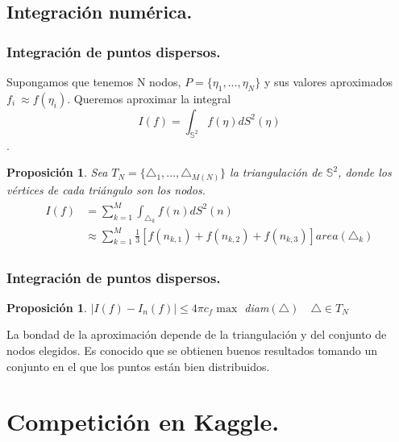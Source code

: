 \documentclass{beamer}
\theoremstyle{plain}
\theoremstyle{definition}
\theoremstyle{plain}
\newtheorem{prop}[thm]{Proposici\'{o}n}
\theoremstyle{definition}
\theoremstyle{remark}
\theoremstyle{definition}
\begin{document}
\subsection{Integración numérica.}
\begin{frame}
\end{frame}
\begin{frame}
	\frametitle{Integración de puntos dispersos.}
	Supongamos que tenemos N nodos, $P=\{\eta_1,...,\eta_N\}$ y sus valores aproximados $f_i~\approx f(\eta_i)$. Queremos aproximar la integral $$I(f) =  \int_{\mathds{S}^2} f(\eta)dS^2(\eta)$$.
	\begin{prop}
		Sea $T_N=\{\triangle_1,...,\triangle_{M(N)}\}$ la triangulación de $\mathds{S}^2$, donde los vértices de cada triángulo son los nodos.
		\begin{gather*}
		\begin{aligned}
			I(f) &= \sum_{k=1}^{M} \int_{\triangle_k} f(n)dS^2(n) \\& \approx  \sum_{k=1}^{M} \frac{1}{3}[f(n_{k,1})+f(n_{k,2})+f(n_{k,3})] area(\triangle_k)
		\end{aligned}
		\end{gather*}
	\end{prop}
\end{frame}
\begin{frame}
		\frametitle{Integración de puntos dispersos.}
		\begin{prop}
			$|I(f)-I_n(f)|\le 4\pi c_f \max$ diam$(\triangle) \quad \triangle\in T_N$
		\end{prop}
	La bondad de la aproximación depende de la triangulación y del conjunto de nodos elegidos.
	Es conocido que se obtienen buenos resultados tomando un conjunto en el que los puntos están bien distribuidos.

\end{frame}
\section{Competición en Kaggle.}
\end{document}
